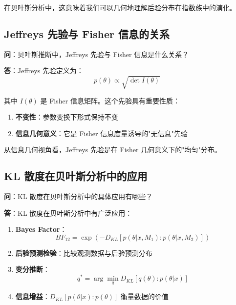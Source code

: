 在贝叶斯分析中，这意味着我们可以几何地理解后验分布在指数族中的演化。

\subsection{Jeffreys 先验与 Fisher 信息的关系}\label{sec:qa-jeffreys-prior-fisher-info}

\textbf{问}：贝叶斯推断中，Jeffreys 先验与 Fisher 信息是什么关系？

\textbf{答}：Jeffreys 先验定义为：
\begin{equation}
    p(\theta) \propto \sqrt{\det I(\theta)}
\end{equation}

其中 $I(\theta)$ 是 Fisher 信息矩阵。这个先验具有重要性质：
\begin{enumerate}
    \item \textbf{不变性}：参数变换下形式保持不变
    \item \textbf{信息几何意义}：它是 Fisher 信息度量诱导的"无信息"先验
\end{enumerate}

从信息几何视角看，Jeffreys 先验是在 Fisher 几何意义下的"均匀"分布。

\subsection{KL 散度在贝叶斯分析中的应用}\label{sec:qa-kl-divergence-bayesian}

\textbf{问}：KL 散度在贝叶斯分析中的具体应用有哪些？

\textbf{答}：KL 散度在贝叶斯分析中有广泛应用：

\begin{enumerate}
    \item \textbf{Bayes Factor}：
    \begin{equation}
    BF_{12} = \exp\left(-D_{KL}[p(\theta|x,M_1) : p(\theta|x,M_2)]\right)
    \end{equation}

    \item \textbf{后验预测检验}：比较观测数据与后验预测分布

    \item \textbf{变分推断}：
    \begin{equation}
    q^* = \arg\min_{q} D_{KL}[q(\theta) : p(\theta|x)]
    \end{equation}

    \item \textbf{信息增益}：$D_{KL}[p(\theta|x) : p(\theta)]$ 衡量数据的价值
\end{enumerate}

